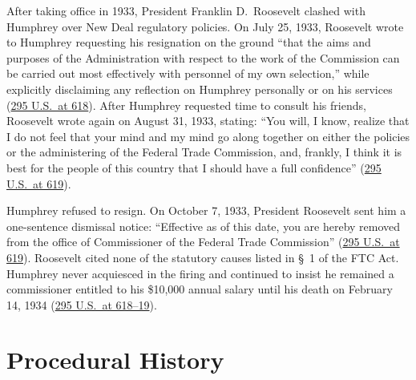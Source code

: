 \documentclass[12pt]{article}
\begin{document}
After taking office in 1933, President Franklin D.\ Roosevelt clashed with Humphrey over New Deal regulatory policies. On July 25, 1933, Roosevelt wrote to Humphrey requesting his resignation on the ground ``that the aims and purposes of the Administration with respect to the work of the Commission can be carried out most effectively with personnel of my own selection,'' while explicitly disclaiming any reflection on Humphrey personally or on his services (\href{https://supreme.justia.com/cases/federal/us/295/602/}{295 U.S.\ at 618}). After Humphrey requested time to consult his friends, Roosevelt wrote again on August 31, 1933, stating: ``You will, I know, realize that I do not feel that your mind and my mind go along together on either the policies or the administering of the Federal Trade Commission, and, frankly, I think it is best for the people of this country that I should have a full confidence'' (\href{https://supreme.justia.com/cases/federal/us/295/602/}{295 U.S.\ at 619}).

Humphrey refused to resign. On October 7, 1933, President Roosevelt sent him a one-sentence dismissal notice: ``Effective as of this date, you are hereby removed from the office of Commissioner of the Federal Trade Commission'' (\href{https://supreme.justia.com/cases/federal/us/295/602/}{295 U.S.\ at 619}). Roosevelt cited none of the statutory causes listed in \S\ 1 of the FTC Act. Humphrey never acquiesced in the firing and continued to insist he remained a commissioner entitled to his \$10,000 annual salary until his death on February 14, 1934 (\href{https://supreme.justia.com/cases/federal/us/295/602/}{295 U.S.\ at 618--19}).

\section{Procedural History}
\end{document}
